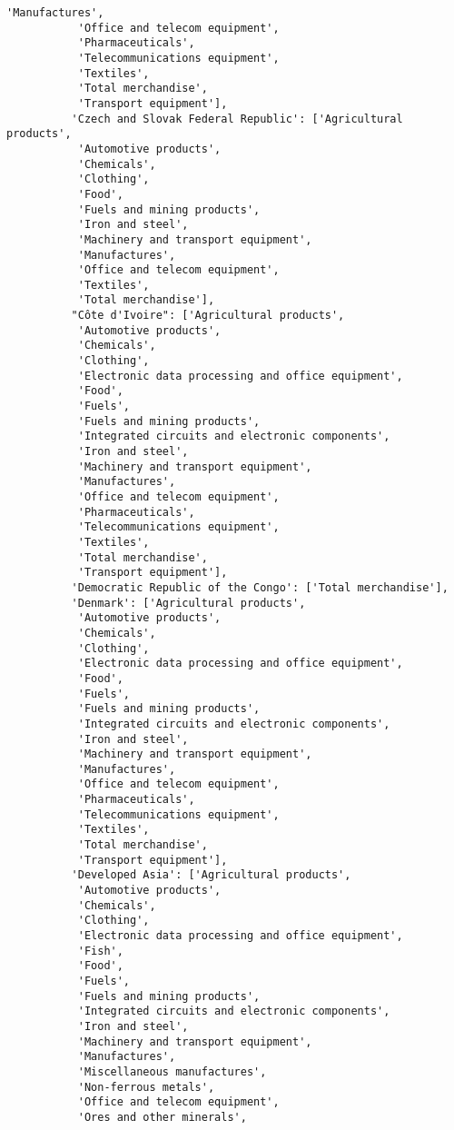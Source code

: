 \documentclass[11pt]{article}
\begin{document}
\begin{Verbatim}[commandchars=\\\{\}]
           'Manufactures',
           'Office and telecom equipment',
           'Pharmaceuticals',
           'Telecommunications equipment',
           'Textiles',
           'Total merchandise',
           'Transport equipment'],
          'Czech and Slovak Federal Republic': ['Agricultural products',
           'Automotive products',
           'Chemicals',
           'Clothing',
           'Food',
           'Fuels and mining products',
           'Iron and steel',
           'Machinery and transport equipment',
           'Manufactures',
           'Office and telecom equipment',
           'Textiles',
           'Total merchandise'],
          "Côte d'Ivoire": ['Agricultural products',
           'Automotive products',
           'Chemicals',
           'Clothing',
           'Electronic data processing and office equipment',
           'Food',
           'Fuels',
           'Fuels and mining products',
           'Integrated circuits and electronic components',
           'Iron and steel',
           'Machinery and transport equipment',
           'Manufactures',
           'Office and telecom equipment',
           'Pharmaceuticals',
           'Telecommunications equipment',
           'Textiles',
           'Total merchandise',
           'Transport equipment'],
          'Democratic Republic of the Congo': ['Total merchandise'],
          'Denmark': ['Agricultural products',
           'Automotive products',
           'Chemicals',
           'Clothing',
           'Electronic data processing and office equipment',
           'Food',
           'Fuels',
           'Fuels and mining products',
           'Integrated circuits and electronic components',
           'Iron and steel',
           'Machinery and transport equipment',
           'Manufactures',
           'Office and telecom equipment',
           'Pharmaceuticals',
           'Telecommunications equipment',
           'Textiles',
           'Total merchandise',
           'Transport equipment'],
          'Developed Asia': ['Agricultural products',
           'Automotive products',
           'Chemicals',
           'Clothing',
           'Electronic data processing and office equipment',
           'Fish',
           'Food',
           'Fuels',
           'Fuels and mining products',
           'Integrated circuits and electronic components',
           'Iron and steel',
           'Machinery and transport equipment',
           'Manufactures',
           'Miscellaneous manufactures',
           'Non-ferrous metals',
           'Office and telecom equipment',
           'Ores and other minerals',

\end{Verbatim}
\end{document}
